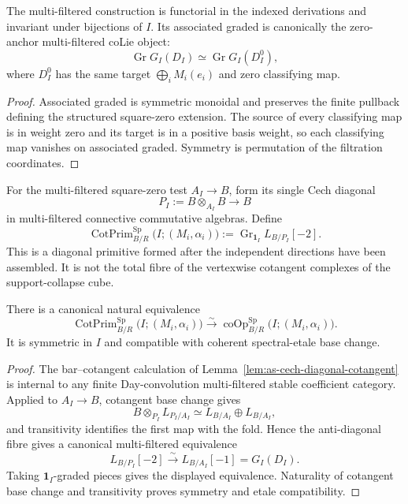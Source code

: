 \begin{proposition}
\label{prop:as-multi-filtered-colie}
The multi-filtered construction is functorial in the indexed derivations and
invariant under bijections of $I$.  Its associated graded is canonically the
zero-anchor multi-filtered coLie object:
\[
\boxed{
    \operatorname{Gr}G_I(D_I)
    \simeq
    \operatorname{Gr}G_I(D_I^0),
}
\]
where $D_I^0$ has the same target
$\bigoplus_iM_i(e_i)$ and zero classifying map.
\end{proposition}

\begin{proof}
Associated graded is symmetric monoidal and preserves the finite pullback
defining the structured square-zero extension.  The source of every
classifying map is in weight zero and its target is in a positive basis weight,
so each classifying map vanishes on associated graded.  Symmetry is permutation
of the filtration coordinates.
\end{proof}

\begin{definition}
\label{def:as-cotangent-marked-primitive}
For the multi-filtered square-zero test $A_I\to B$, form its single Cech
diagonal
\[
    P_I:=B\otimes_{A_I}B\longrightarrow B
\]
in multi-filtered connective commutative algebras.  Define
\[
\boxed{
    \operatorname{CotPrim}^{\mathrm{Sp}}_{B/R}
    \bigl(I;(M_i,\alpha_i)\bigr)
    :=
    \operatorname{Gr}_{\mathbf1_I}
    L_{B/P_I}[-2].
}
\]
This is a diagonal primitive formed after the independent directions have been
assembled.  It is not the total fibre of the vertexwise cotangent complexes of
the support-collapse cube.
\end{definition}

\begin{theorem}
\label{thm:as-multifiltered-diagonal-primitive}
There is a canonical natural equivalence
\[
\boxed{
    \operatorname{CotPrim}^{\mathrm{Sp}}_{B/R}
    \bigl(I;(M_i,\alpha_i)\bigr)
    \xrightarrow{\sim}
    \operatorname{coOp}^{\mathrm{Sp}}_{B/R}
    \bigl(I;(M_i,\alpha_i)\bigr).
}
\]
It is symmetric in $I$ and compatible with coherent spectral-etale base
change.
\end{theorem}

\begin{proof}
The bar--cotangent calculation of
Lemma~\ref{lem:as-cech-diagonal-cotangent} is internal to any finite
Day-convolution multi-filtered stable coefficient category.  Applied to
$A_I\to B$, cotangent base change gives
\[
    B\otimes_{P_I}L_{P_I/A_I}
    \simeq
    L_{B/A_I}\oplus L_{B/A_I},
\]
and transitivity identifies the first map with the fold.  Hence the
anti-diagonal fibre gives a canonical multi-filtered equivalence
\[
    L_{B/P_I}[-2]
    \xrightarrow{\sim}
    L_{B/A_I}[-1]
    =G_I(D_I).
\]
Taking $\mathbf1_I$-graded pieces gives the displayed equivalence.  Naturality
of cotangent base change and transitivity proves symmetry and etale
compatibility.
\end{proof}

